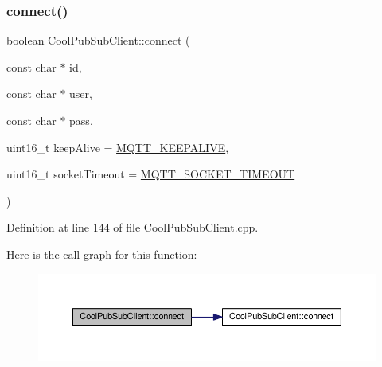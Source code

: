 \subsubsection{\texorpdfstring{connect()}{connect()}\hspace{0.1cm}{\footnotesize\ttfamily [2/4]}}
{\footnotesize\ttfamily boolean Cool\+Pub\+Sub\+Client\+::connect (\begin{DoxyParamCaption}\item[{const char $\ast$}]{id,  }\item[{const char $\ast$}]{user,  }\item[{const char $\ast$}]{pass,  }\item[{uint16\+\_\+t}]{keep\+Alive = {\ttfamily \hyperlink{_cool_pub_sub_client_8h_afb4dd8c75385ab30e659314df7c2c335}{M\+Q\+T\+T\+\_\+\+K\+E\+E\+P\+A\+L\+I\+VE}},  }\item[{uint16\+\_\+t}]{socket\+Timeout = {\ttfamily \hyperlink{_cool_pub_sub_client_8h_a092cc564e4d7f03fdab6137e30a7f05b}{M\+Q\+T\+T\+\_\+\+S\+O\+C\+K\+E\+T\+\_\+\+T\+I\+M\+E\+O\+UT}} }\end{DoxyParamCaption})}



Definition at line 144 of file Cool\+Pub\+Sub\+Client.\+cpp.

Here is the call graph for this function\+:
\nopagebreak
\begin{figure}[H]
\begin{center}
\leavevmode
\includegraphics[width=350pt]{class_cool_pub_sub_client_a7f30e39bf4ca5ea5fb9747c403639a03_cgraph}
\end{center}
\end{figure}
\mbox{\label{class_cool_pub_sub_client_af461a5a08fda1c3237e706965704ddb6}} 
